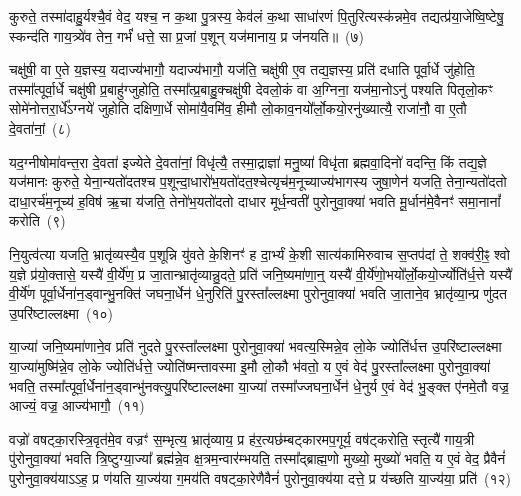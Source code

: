 कुरुते॒ तस्मा॑दाहु॒र्यश्चै॒वं वेद॒ यश्च॒ न क॒था पु॒त्रस्य॒ केव॑लं क॒था साधा॑रणं पि॒तुरित्यस्क॑न्नमे॒व तद्यत्प्र॑या॒जेष्वि॒ष्टेषु॒ स्कन्द॑ति गाय॒त्र्ये॑व तेन॒ गर्भं॑ धत्ते॒ सा प्र॒जां प॒शून् यज॑मानाय॒ प्र ज॑नयति॥~(७)

{}%

चक्षु॑षी॒ वा ए॒ते य॒ज्ञस्य॒ यदाज्य॑भागौ॒ यदाज्य॑भागौ॒ यज॑ति॒ चक्षु॑षी ए॒व तद्य॒ज्ञस्य॒ प्रति॑ दधाति पूर्वा॒र्धे जु॑होति॒ तस्मा᳚त्पूर्वा॒र्धे चक्षु॑षी प्र॒बाहु॑ग्जुहोति॒ तस्मा᳚त्प्र॒बाहु॒क्चक्षु॑षी देवलो॒कं वा अ॒ग्निना॒ यज॑मा॒नो\-ऽनु॑ पश्यति पितृलो॒कꣳ सोमे॑नोत्तरा॒र्धे᳚\-ऽग्नये॑ जुहोति दक्षिणा॒र्धे सोमा॑यै॒वमि॑व॒ हीमौ लो॒काव॒नयो᳚र्लो॒कयो॒रनु॑ख्यात्यै॒ राजा॑नौ॒ वा ए॒तौ दे॒वता॑नां॒~(८)

यद॒ग्नी\-षोमा॑वन्त॒रा दे॒वता॑ इज्येते दे॒वता॑नां॒ विधृ॑त्यै॒ तस्मा॒द्राज्ञा॑ मनु॒ष्या॑ विधृ॑ता ब्रह्मवा॒दिनो॑ वदन्ति॒ किं तद्य॒ज्ञे यज॑मानः कुरुते॒ येना॒न्यतो॑दतश्च प॒शून्दा॒धारो॑भ॒यतो॑दत॒श्चेत्यृच॑म॒नूच्याज्य॑भागस्य जुषा॒णेन॑ यजति॒ तेना॒न्यतो॑दतो दाधा॒रर्च॑म॒नूच्य॑ ह॒विष॑ ऋ॒चा य॑जति॒ तेनो॑भ॒यतो॑दतो दाधार मूर्ध॒न्वती॑ पुरोनुवा॒क्या॑ भवति मू॒र्धान॑मे॒वैनꣳ॑ समा॒नानां᳚ करोति~(९)

नि॒युत्व॑त्या यजति॒ भ्रातृ॑व्यस्यै॒व प॒शून्नि यु॑वते के॒शिनꣳ॑ ह दा॒र्भ्यं के॒शी सात्य॑कामिरुवाच स॒प्तप॑दां ते॒ शक्व॑री॒ꣴ॒ श्वो य॒ज्ञे प्र॑यो॒क्तासे॒ यस्यै॑ वी॒र्ये॑ण॒ प्र जा॒तान्भ्रातृ॑व्यान्नु॒दते॒ प्रति॑ जनि॒ष्यमा॑णा॒न्॒ यस्यै॑ वी॒र्ये॑णो॒भयो᳚र्लो॒कयो॒र्ज्योति॑र्ध॒त्ते यस्यै॑ वी॒र्ये॑ण पूर्वा॒र्धेना॑न॒ड्वान्भु॒नक्ति॑ जघना॒र्धेन॑ धे॒नुरिति॑ पु॒रस्ता᳚ल्लक्ष्मा पुरोनुवा॒क्या॑ भवति जा॒ताने॒व भ्रातृ॑व्या॒न्प्र णु॑दत उ॒परि॑ष्टाल्लक्ष्मा~(१०)

या॒ज्या॑ जनि॒ष्यमा॑णाने॒व प्रति॑ नुदते पु॒रस्ता᳚ल्लक्ष्मा पुरोनुवा॒क्या॑ भवत्य॒स्मिन्ने॒व लो॒के ज्योति॑र्धत्त उ॒परि॑ष्टाल्लक्ष्मा या॒ज्या॑मुष्मि॑न्ने॒व लो॒के ज्योति॑र्धत्ते॒ ज्योति॑ष्मन्तावस्मा इ॒मौ लो॒कौ भ॑वतो॒ य ए॒वं वेद॑ पु॒रस्ता᳚ल्लक्ष्मा पुरोनुवा॒क्या॑ भवति॒ तस्मा᳚त्पूर्वा॒र्धेना॑न॒ड्वान्भु॑नक्त्यु॒परि॑ष्टाल्लक्ष्मा या॒ज्या॑ तस्मा᳚ज्जघना॒र्धेन॑ धे॒नुर्य ए॒वं वेद॑ भु॒ङ्क्त ए॑नमे॒तौ वज्र॒ आज्यं॒ वज्र॒ आज्य॑भागौ॒~(११)

वज्रो॑ वषट्का॒रस्त्रि॒वृत॑मे॒व वज्रꣳ॑ स॒म्भृत्य॒ भ्रातृ॑व्याय॒ प्र ह॑र॒त्यछ॑म्बट्कारमप॒गूर्य॒ वष॑ट्करोति॒ स्तृत्यै॑ गाय॒त्री पु॑रोनुवा॒क्या॑ भवति त्रि॒ष्टुग्या॒ज्या᳚ ब्रह्म॑न्ने॒व क्ष॒त्रम॒न्वार॑म्भयति॒ तस्मा᳚द्ब्राह्म॒णो मुख्यो॒ मुख्यो॑ भवति॒ य ए॒वं वेद॒ प्रैवैनं॑ पुरोनुवा॒क्य॑या\-ऽऽ\-ह॒ प्र ण॑यति या॒ज्य॑या ग॒मय॑ति वषट्का॒रेणैवैनं॑ पुरोनुवा॒क्य॑या दत्ते॒ प्र य॑च्छति या॒ज्य॑या॒ प्रति॑~(१२)

